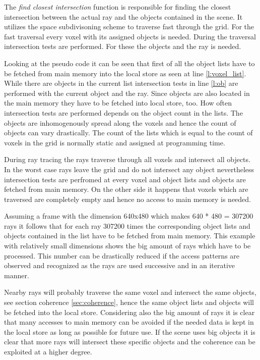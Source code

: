 \documentclass[DIV10, abstracton, openright, footsepline, headsepline, twoside, 9pt,
bigheadings]{scrreprt}
\begin{document}
The \textit{find closest intersection} function is responsible for finding the
closest intersection between the actual ray and the objects contained in the
scene. It utilizes the space subdivisoning scheme to traverse fast through
the grid.  For the fast traversal every voxel with its assigned objects is needed.
During the traversal intersection tests are performed. For these the objects
and the ray is needed.

Looking at the pseudo code it can be seen that first of all the object lists
have to be fetched from main memory into the local store as seen at line
\ref{l:voxel_list}. While there are objects in the current list intersection tests in line \ref{l:ob} are performed with the current object and the ray. Since objects are
also located in the main memory they have to be fetched into local store, too.
How often intersection tests are performed depends on the object count in the
lists. The objects are inhomogenously spread along the voxels and hence the
 count of objects can vary drastically. The count of the lists which is equal to the count of voxels in the grid is normally static and assigned at programming time.

During ray tracing the rays traverse through all voxels and intersect all objects.
In the worst case rays leave the grid and do not intersect any object nevertheless
intersection tests are perfromed at every voxel and object lists and
objects are fetched from main memory. On the other side it happens that voxels which
are traversed are completely empty and hence no access to main memory is needed.

Assuming a frame with the dimension 640x480 which makes 640 * 480 = 307200
rays it follows that for each ray 307200 times the corresponding object lists and
objects contained in the list have to be fetched from main memory. This example with
relatively small dimensions shows the big amount of rays which have to be processed.
This number can be drastically reduced if the access patterns are observed and
recognized as the rays are used successive and in an iterative manner.

Nearby rays will probably traverse the same voxel and intersect the same objects, see
section coherence \ref{sec:coherence}, hence the same object lists and objects will
be fetched into the local store. Considering also the big amount of rays it is clear
that many accesses to main memory can be avoided if the needed data is kept in the
local store as long as possible for future use. If the scene uses big objects it is
clear that  more rays will intersect these specific objects and the coherence
can be exploited at a higher degree.
\end{document}

